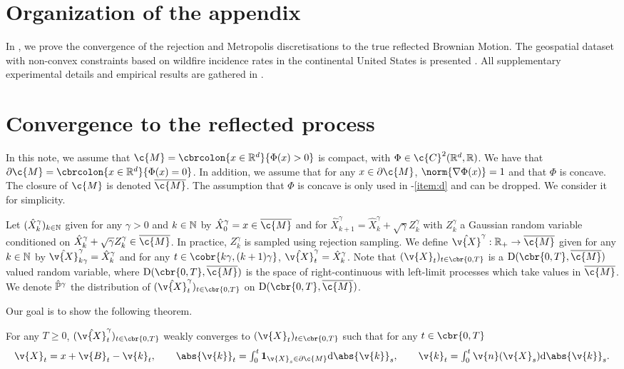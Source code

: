 
\section*{Organization of the appendix}
In , we prove the convergence of the rejection and Metropolis discretisations to the true reflected Brownian Motion.
The geospatial dataset with non-convex constraints based on wildfire incidence rates in the continental United States is presented .
All supplementary experimental details and empirical results are gathered in .
			
\section{Convergence to the reflected process}\label{sec:rejection-convergence} \def \Kker {\mathrm{K}} In this note, we assume that $\c{M} = \cbrcolon{x \in \R^d}{\Phi(x) > 0}$ is compact, with $\Phi \in \c{C}^2(\R^d, \R)$.
We have that $\partial \c{M} = \cbrcolon{x \in \R^d}{\Phi(x) = 0}$.
In addition, we assume that for any $x \in \partial \c{M}$, $\norm{\nabla \Phi(x)} = 1$ and that $\Phi$ is concave.
The closure of $\c{M}$ is denoted $\cl{\c{M}}$.
The assumption that $\Phi$ is concave is only used in -\ref{item:d} and can be dropped.
We consider it for simplicity.

Let $(\hat{X}_k^\gamma)_{k \in \mathbb{N}}$ given for any $\gamma >0$ and $k \in \mathbb{N}$ by $\hat{X}_0^\gamma = x \in \cl{\c{M}}$ and for $\hat{X}_{k+1}^\gamma = \hat{X}_k^\gamma + \sqrt{\gamma} Z_k^\gamma$ with $Z_k^\gamma$ a Gaussian random variable conditioned on $\hat{X}_k^\gamma + \sqrt{\gamma} Z_k^\gamma \in \cl{\c{M}}$.
In practice, $Z_k^\gamma$ is sampled using rejection sampling.
We define $\hat{\v{X}}^\gamma : \R_+ \to \cl{\c{M}}$ given for any $k \in \mathbb{N}$ by $\hat{\v{X}}^\gamma_{k\gamma} = \hat{X}_k^\gamma$ and for any $t \in \cobr{k\gamma, (k+1)\gamma}$, $\hat{\v{X}}^\gamma_t = \hat{X}_{k}^\gamma$.
Note that $(\v{X}_t)_{t \in \cbr{0,T}}$ is a $\mathrm{D}(\cbr{0,T}, \cl{\c{M}})$ valued random variable, where $\mathrm{D}(\cbr{0,T}, \cl{\c{M}})$ is the space of right-continuous with left-limit processes which take values in $\cl{\c{M}}$.
We denote $\hat{\bb{P}}^\gamma$ the distribution of $(\hat{\v{X}}_t^\gamma)_{t \in \cbr{0,T}}$ on $\mathrm{D}(\cbr{0,T}, \cl{\c{M}})$.

Our goal is to show the following theorem.

\begin{theorem}
	\label{thm:weak_convergence_appendix}
	For any $T \geq 0$, $(\hat{\v{X}}_t^\gamma)_{t \in \cbr{0,T}}$ weakly converges to $(\v{X}_t)_{t \in \cbr{0,T}}$ such that for any $t \in \cbr{0,T}$ \begin{equation} \label{eq:skorkhod_pbm} \textstyle \v{X}_t = x + \v{B}_t - \v{k}_t , \qquad \abs{\v{k}}_t = \int_0^t \bm{1}_{\v{X}_s \in \partial \c{M}} \mathrm{d} \abs{\v{k}}_s , \qquad \v{k}_t = \int_0^t \v{n}(\v{X}_s) \mathrm{d} \abs{\v{k}}_s .
	\end{equation}
\end{theorem}

